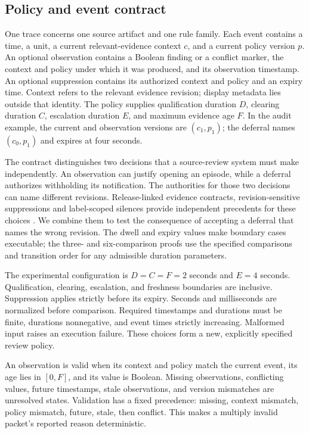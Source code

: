 \documentclass[preprint,11pt]{elsarticle}
\begin{document}
\subsection{Policy and event contract}
One trace concerns one source artifact and one rule family. Each event contains a time, a unit, a current relevant-evidence context $c$, and a current policy version $p$. An optional observation contains a Boolean finding or a conflict marker, the context and policy under which it was produced, and its observation timestamp. An optional suppression contains its authorized context and policy and an expiry time. Context refers to the relevant evidence revision; display metadata lies outside that identity. The policy supplies qualification duration $D$, clearing duration $C$, escalation duration $E$, and maximum evidence age $F$. In the audit example, the current and observation versions are $(c_1,p_1)$; the deferral names $(c_0,p_1)$ and expires at four seconds.

The contract distinguishes two decisions that a source-review system must make independently. An observation can justify opening an episode, while a deferral authorizes withholding its notification. The authorities for those two decisions can name different revisions. Release-linked evidence contracts, revision-sensitive suppressions and label-scoped silences provide independent precedents for these choices \cite{nwekeyeng2026compliance,skillaudit2026suppression,prometheus2026alertmanager}. We combine them to test the consequence of accepting a deferral that names the wrong revision. The dwell and expiry values make boundary cases executable; the three- and six-comparison proofs use the specified comparisons and transition order for any admissible duration parameters.

The experimental configuration is $D=C=F=2$ seconds and $E=4$ seconds. Qualification, clearing, escalation, and freshness boundaries are inclusive. Suppression applies strictly before its expiry. Seconds and milliseconds are normalized before comparison. Required timestamps and durations must be finite, durations nonnegative, and event times strictly increasing. Malformed input raises an execution failure. These choices form a new, explicitly specified review policy.

An observation is valid when its context and policy match the current event, its age lies in $[0,F]$, and its value is Boolean. Missing observations, conflicting values, future timestamps, stale observations, and version mismatches are unresolved states. Validation has a fixed precedence: missing, context mismatch, policy mismatch, future, stale, then conflict. This makes a multiply invalid packet's reported reason deterministic.
\end{document}

